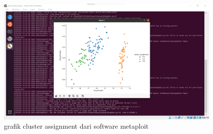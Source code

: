 \begin{enumerate}
\begin{figure}[!ht]
\includegraphics[width=.8\textwidth]{TugasKelompok/Kelompok4/grafikkedua}
\caption{grafik cluster assignment dari software metaploit}
\label{gam:perkuliahan-23-09}
\end{figure}

\end{enumerate}
